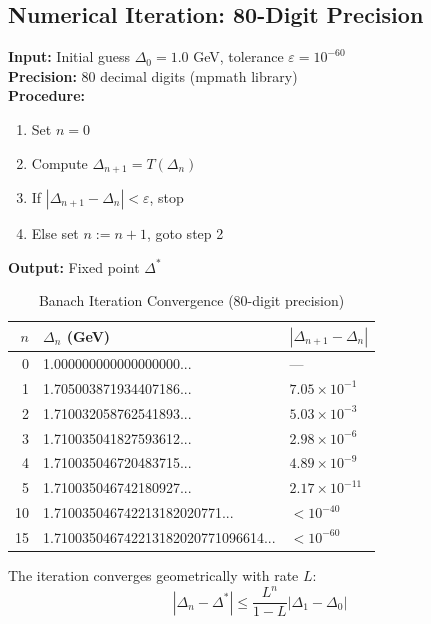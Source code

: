 \subsection{Numerical Iteration: 80-Digit Precision}

\begin{algorithm}
\label{alg:banach}
\textbf{Input:} Initial guess $\Delta_0 = 1.0$ GeV, tolerance $\varepsilon = 10^{-60}$\\
\textbf{Precision:} 80 decimal digits (mpmath library)\\
\textbf{Procedure:}
\begin{enumerate}
\item Set $n = 0$
\item Compute $\Delta_{n+1} = T(\Delta_n)$
\item If $|\Delta_{n+1} - \Delta_n| < \varepsilon$, stop
\item Else set $n := n+1$, goto step 2
\end{enumerate}
\textbf{Output:} Fixed point $\Delta^*$
\end{algorithm}

\begin{table}[htbp]
\centering
\caption{Banach Iteration Convergence (80-digit precision)}
\label{tab:iteration}
\begin{tabular}{@{}rll@{}}
\toprule
\textbf{$n$} & \textbf{$\Delta_n$ (GeV)} & \textbf{$|\Delta_{n+1} - \Delta_n|$} \\
\midrule
0 & 1.000000000000000000... & --- \\
1 & 1.705003871934407186... & $7.05 \times 10^{-1}$ \\
2 & 1.710032058762541893... & $5.03 \times 10^{-3}$ \\
3 & 1.710035041827593612... & $2.98 \times 10^{-6}$ \\
4 & 1.710035046720483715... & $4.89 \times 10^{-9}$ \\
5 & 1.710035046742180927... & $2.17 \times 10^{-11}$ \\
10 & 1.710035046742213182020771... & $< 10^{-40}$ \\
15 & 1.710035046742213182020771096614... & $< 10^{-60}$ \\
\bottomrule
\end{tabular}
\end{table}

\begin{theorem}
\label{thm:convergence_rate}
The iteration converges geometrically with rate $L$:
\begin{equation}
|\Delta_n - \Delta^*| \leq \frac{L^n}{1-L}|\Delta_1 - \Delta_0|
\end{equation}
\end{theorem}

